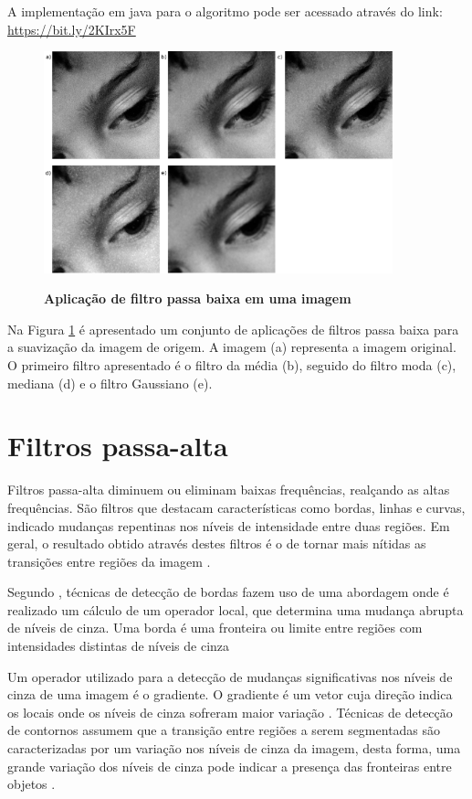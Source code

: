 \documentclass[
	12pt,				%
	oneside,			%
	a4paper,			%
	english,			%
	french,				%
	spanish,			%
	brazil,				%
	]{abntex2}
\begin{document}
A implementação em java para o algoritmo pode ser acessado através do link: \url{https://bit.ly/2KIrx5F}

\begin{figure}[ht]
\centering
\caption{\textbf{Aplicação de filtro passa baixa em uma imagem}}
\includegraphics[width=0.9\textwidth]{imagens/suavizacao.png}
\sourceAuthor
\label{fig:suavizacao}
\end{figure}

Na Figura \ref{fig:suavizacao} é apresentado um conjunto de aplicações de filtros passa baixa para a suavização da imagem de origem. A imagem (a) representa a imagem original.  O primeiro filtro apresentado é o filtro da média (b), seguido do filtro moda (c), mediana (d) e o filtro Gaussiano (e).

\section{Filtros passa-alta}

Filtros passa-alta diminuem ou eliminam baixas frequências, realçando as altas frequências. São filtros que destacam características como bordas, linhas e curvas, indicado mudanças repentinas nos níveis de intensidade entre duas regiões. Em geral, o resultado obtido através destes filtros é o de tornar mais nítidas as transições entre regiões da imagem \cite{conciAzevedoLeta:2008}.

Segundo \citet{pedriniSchwartz:2008}, técnicas de detecção de bordas fazem uso de uma abordagem onde é realizado um cálculo de um operador local, que determina uma mudança abrupta de níveis de cinza. Uma borda é uma fronteira ou limite entre regiões com intensidades distintas de níveis de cinza

Um operador utilizado para a detecção de mudanças significativas nos níveis de cinza de uma imagem é o gradiente. O gradiente é um vetor cuja direção indica os locais onde os níveis de cinza sofreram maior variação \cite{pedriniSchwartz:2008}. Técnicas de detecção de contornos assumem que a transição entre regiões a serem segmentadas são caracterizadas por um variação nos níveis de cinza da imagem, desta forma, uma grande variação dos níveis de cinza pode indicar a presença das fronteiras entre objetos \cite{conciAzevedoLeta:2008}. 
\end{document}
